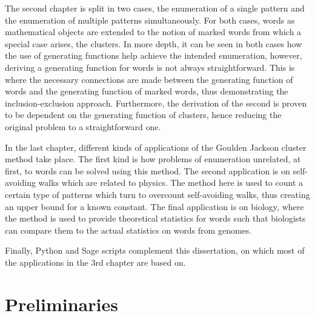 \documentclass[12pt]{report}
\begin{document}
The second chapter is split in two cases, the enumeration of a single pattern and the enumeration of multiple patterns simultaneously. For both cases, words as mathematical objects are extended to the notion of marked words from which a special case arises, the clusters. In more depth, it can be seen in both cases how the use of generating functions help achieve the intended enumeration, however, deriving a generating function for words is not always straightforward. This is where the necessary connections are made between the generating function of words and the generating function of marked words, thus demonstrating the inclusion-exclusion approach. Furthermore, the derivation of the second is proven to be dependent on the generating function of clusters, hence reducing the original problem to a straightforward one.

In the last chapter, different kinds of applications of the Goulden Jackson cluster method take place. The first kind is how problems of enumeration unrelated, at first, to words can be solved using this method. The second application is on self-avoiding walks which are related to physics. The method here is used to count a certain type of patterns which turn to overcount self-avoiding walks, thus creating an upper bound for a known constant. The final application is on biology, where the method is used to provide theoretical statistics for words such that biologists can compare them to the actual statistics on words from genomes.

Finally, Python and Sage scripts complement this dissertation, on which most of the applications in the 3rd chapter are based on.


\tableofcontents


\chapter{Preliminaries}
\end{document}
